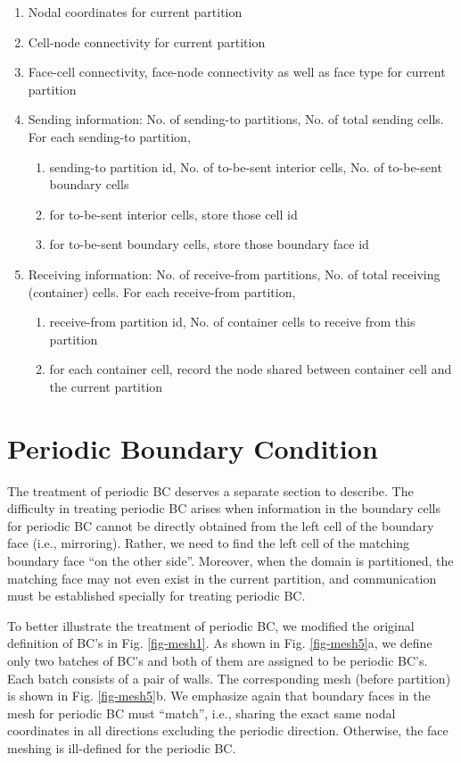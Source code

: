 \documentclass[12pt, letterpaper]{report}
\begin{document}
\begin{enumerate}
   \item Nodal coordinates for current partition
   \item Cell-node connectivity for current partition
   \item Face-cell connectivity, face-node connectivity as well as face type for current partition
   \item Sending information: No. of sending-to partitions, No. of total sending cells. For each
      sending-to partition,
      \begin{enumerate}
         \item sending-to partition id, No. of to-be-sent interior cells, No. of to-be-sent boundary cells
         \item for to-be-sent interior cells, store those cell id
         \item for to-be-sent boundary cells, store those boundary face id
      \end{enumerate}
   \item Receiving information: No. of receive-from partitions, No. of total receiving (container)
      cells. For each receive-from partition, 
      \begin{enumerate}
         \item receive-from partition id, No. of container cells to receive from this partition
         \item for each container cell, record the node shared between container cell and the
            current partition
      \end{enumerate}
\end{enumerate}
\paraspace

\section{Periodic Boundary Condition} \label{c1s4}

The treatment of periodic BC deserves a separate section to describe. The difficulty in treating
periodic BC arises when information in the boundary cells for periodic BC cannot be directly
obtained from the left cell of the boundary face (i.e., mirroring). Rather, we need to find the left
cell of the matching boundary face ``on the other side''. Moreover, when the domain is partitioned,
the matching face may not even exist in the current partition, and communication must be established
specially for treating periodic BC.
\paraspace

To better illustrate the treatment of periodic BC, we modified the original definition of BC's in
Fig. \ref{fig-mesh1}. As shown in Fig. \ref{fig-mesh5}a, we define only two batches of BC's and both of them are
assigned to be periodic BC's. Each batch consists of a pair of walls. The corresponding mesh (before
partition) is shown in Fig. \ref{fig-mesh5}b. We emphasize again that boundary faces in the mesh for periodic BC
must ``match'', i.e., sharing the exact same nodal coordinates in all directions excluding the
periodic direction. Otherwise, the face meshing is ill-defined for the periodic BC.
\end{document}
